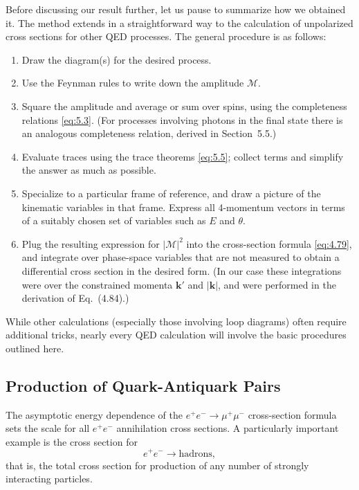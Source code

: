 Before discussing our result further, let us pause to summarize how we
obtained it.  The method extends in a straightforward way to the calculation
of unpolarized cross sections for other QED processes.  The general procedure
is as follows:
\begin{enumerate}
  \item Draw the diagram(s) for the desired process.
  \item Use the Feynman rules to write down the amplitude $\mathcal{M}$.
  \item Square the amplitude and average or sum over spins, using the
    completeness relations \eqref{eq:5.3}.  (For processes involving photons
    in the final state there is an analogous completeness relation, derived
    in Section~5.5.)
  \item Evaluate traces using the trace theorems \eqref{eq:5.5}; collect terms
    and simplify the answer as much as possible.
  \item Specialize to a particular frame of reference, and draw a picture of
    the kinematic variables in that frame.  Express all 4-momentum vectors in
    terms of a suitably chosen set of variables such as $E$ and $\theta$.
  \item Plug the resulting expression for $|\mathcal{M}|^2$ into the
    cross-section formula \eqref{eq:4.79}, and integrate over phase-space
    variables that are not measured to obtain a differential cross section in
    the desired form.  (In our case these integrations were over the
    constrained momenta $\mathbf{k}'$ and $|\mathbf{k}|$, and were performed
    in the derivation of Eq.~(4.84).)
\end{enumerate}
While other calculations (especially those involving loop diagrams) often
require additional tricks, nearly every QED calculation will involve the basic
procedures outlined here.

\subsection{Production of Quark-Antiquark Pairs}

The asymptotic energy dependence of the $e^{+}e^{-}\to\mu^{+}\mu^{-}$
cross-section formula sets the scale for all $e^{+}e^{-}$ annihilation cross
sections.  A particularly important example is the cross section for
\begin{equation}
  e^{+}e^{-} \to \text{hadrons},
\end{equation}
that is, the total cross section for production of any number of strongly
interacting particles.

